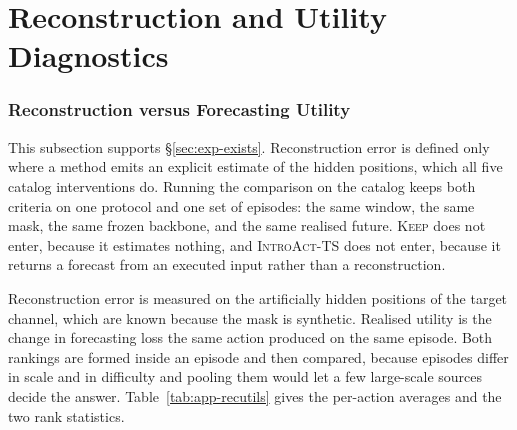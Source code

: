 \documentclass{article}
\newcommand{\introact}{\textsc{IntroAct-TS}}
\begin{document}
\section{Reconstruction and Utility Diagnostics}
\label{app:diagnostics}
\subsubsection{Reconstruction versus Forecasting Utility}
\label{app:recutils}
This subsection supports \S\ref{sec:exp-exists}. Reconstruction error is defined only where a
method emits an explicit estimate of the hidden positions, which all five catalog interventions
do. Running the comparison on the catalog keeps both criteria on one protocol and
one set of episodes: the same window, the same mask, the same frozen backbone, and the same
realised future. \textsc{Keep} does not enter, because it estimates nothing, and \introact{}
does not enter, because it returns a forecast from an executed input rather than a
reconstruction.

Reconstruction error is measured on the artificially hidden positions of the target channel,
which are known because the mask is synthetic. Realised utility is the change in forecasting
loss the same action produced on the same episode. Both rankings are formed inside an episode
and then compared, because episodes differ in scale and in difficulty and pooling them would
let a few large-scale sources decide the answer. Table~\ref{tab:app-recutils} gives the
per-action averages and the two rank statistics.
\end{document}
